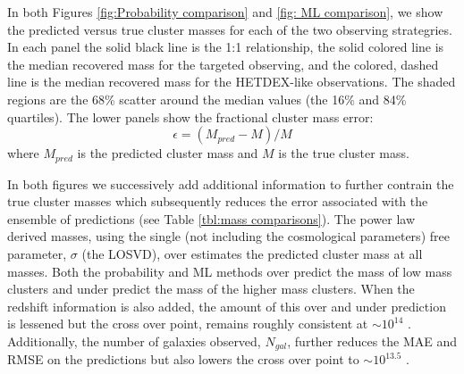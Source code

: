 \documentclass[fleqn,usenatbib]{mnras}
\begin{document}
In both Figures \ref{fig:Probability comparison} and \ref{fig: ML comparison}, we show the predicted versus true cluster masses for each of the two observing strategries. In each panel the solid black line is the 1:1 relationship, the solid colored line is the median recovered mass for the targeted observing, and the colored, dashed line is the median recovered mass for the HETDEX-like observations. The shaded regions are the 68\% scatter around the median values (the 16\% and 84\% quartiles). The lower panels show the fractional cluster mass error: 
\begin{equation}\label{eq: fractional error}
	\epsilon = (M_{pred} - M)/M
\end{equation}
where $M_{pred}$ is the predicted cluster mass and $M$ is the true cluster mass.

In both figures we successively add additional information to further contrain the true cluster masses which subsequently reduces the error associated with the ensemble of predictions (see Table \ref{tbl:mass comparisons}). The power law derived masses, using the single (not including the cosmological parameters) free parameter, $\sigma$ (the LOSVD), over estimates the predicted cluster mass at all masses. Both the probability and ML methods over predict the mass of low mass clusters and under predict the mass of the higher mass clusters. When the redshift information is also added, the amount of this over and under prediction is lessened but the cross over point, remains roughly consistent at $\sim10^{14}$ \msol. Additionally, the number of galaxies observed, $N_{gal}$, further reduces the MAE and RMSE on the predictions but also lowers the cross over point to $\sim10^{13.5}$ \msol.
\end{document}
